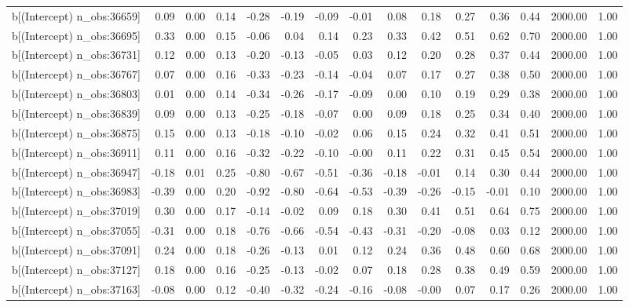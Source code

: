 \begin{table}[ht]
\begin{tabular}{rrrrrrrrrrrrrrr}
  b[(Intercept) n\_obs:36659] & 0.09 & 0.00 & 0.14 & -0.28 & -0.19 & -0.09 & -0.01 & 0.08 & 0.18 & 0.27 & 0.36 & 0.44 & 2000.00 & 1.00 \\ 
  b[(Intercept) n\_obs:36695] & 0.33 & 0.00 & 0.15 & -0.06 & 0.04 & 0.14 & 0.23 & 0.33 & 0.42 & 0.51 & 0.62 & 0.70 & 2000.00 & 1.00 \\ 
  b[(Intercept) n\_obs:36731] & 0.12 & 0.00 & 0.13 & -0.20 & -0.13 & -0.05 & 0.03 & 0.12 & 0.20 & 0.28 & 0.37 & 0.44 & 2000.00 & 1.00 \\ 
  b[(Intercept) n\_obs:36767] & 0.07 & 0.00 & 0.16 & -0.33 & -0.23 & -0.14 & -0.04 & 0.07 & 0.17 & 0.27 & 0.38 & 0.50 & 2000.00 & 1.00 \\ 
  b[(Intercept) n\_obs:36803] & 0.01 & 0.00 & 0.14 & -0.34 & -0.26 & -0.17 & -0.09 & 0.00 & 0.10 & 0.19 & 0.29 & 0.38 & 2000.00 & 1.00 \\ 
  b[(Intercept) n\_obs:36839] & 0.09 & 0.00 & 0.13 & -0.25 & -0.18 & -0.07 & 0.00 & 0.09 & 0.18 & 0.25 & 0.34 & 0.40 & 2000.00 & 1.00 \\ 
  b[(Intercept) n\_obs:36875] & 0.15 & 0.00 & 0.13 & -0.18 & -0.10 & -0.02 & 0.06 & 0.15 & 0.24 & 0.32 & 0.41 & 0.51 & 2000.00 & 1.00 \\ 
  b[(Intercept) n\_obs:36911] & 0.11 & 0.00 & 0.16 & -0.32 & -0.22 & -0.10 & -0.00 & 0.11 & 0.22 & 0.31 & 0.45 & 0.54 & 2000.00 & 1.00 \\ 
  b[(Intercept) n\_obs:36947] & -0.18 & 0.01 & 0.25 & -0.80 & -0.67 & -0.51 & -0.36 & -0.18 & -0.01 & 0.14 & 0.30 & 0.44 & 2000.00 & 1.00 \\ 
  b[(Intercept) n\_obs:36983] & -0.39 & 0.00 & 0.20 & -0.92 & -0.80 & -0.64 & -0.53 & -0.39 & -0.26 & -0.15 & -0.01 & 0.10 & 2000.00 & 1.00 \\ 
  b[(Intercept) n\_obs:37019] & 0.30 & 0.00 & 0.17 & -0.14 & -0.02 & 0.09 & 0.18 & 0.30 & 0.41 & 0.51 & 0.64 & 0.75 & 2000.00 & 1.00 \\ 
  b[(Intercept) n\_obs:37055] & -0.31 & 0.00 & 0.18 & -0.76 & -0.66 & -0.54 & -0.43 & -0.31 & -0.20 & -0.08 & 0.03 & 0.12 & 2000.00 & 1.00 \\ 
  b[(Intercept) n\_obs:37091] & 0.24 & 0.00 & 0.18 & -0.26 & -0.13 & 0.01 & 0.12 & 0.24 & 0.36 & 0.48 & 0.60 & 0.68 & 2000.00 & 1.00 \\ 
  b[(Intercept) n\_obs:37127] & 0.18 & 0.00 & 0.16 & -0.25 & -0.13 & -0.02 & 0.07 & 0.18 & 0.28 & 0.38 & 0.49 & 0.59 & 2000.00 & 1.00 \\ 
  b[(Intercept) n\_obs:37163] & -0.08 & 0.00 & 0.12 & -0.40 & -0.32 & -0.24 & -0.16 & -0.08 & -0.00 & 0.07 & 0.17 & 0.26 & 2000.00 & 1.00 \\ 

\end{tabular}
\end{table}
